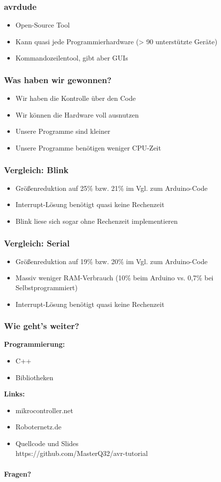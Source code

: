 \documentclass{beamer}
\begin{document}
\begin{frame}
\frametitle{avrdude}
\begin{itemize}
\item Open-Source Tool
\item Kann quasi jede Programmierhardware (> 90 unterstützte Geräte)
\item Kommandozeilentool, gibt aber GUIs
\end{itemize}

\end{frame}

\begin{frame}
\frametitle{Was haben wir gewonnen?}
\begin{itemize}
\item Wir haben die Kontrolle über den Code
\item Wir können die Hardware voll ausnutzen
\item Unsere Programme sind kleiner
\item Unsere Programme benötigen weniger CPU-Zeit
\end{itemize}
\end{frame}

\begin{frame}
\frametitle{Vergleich: Blink}

\begin{itemize}
\item Größenreduktion auf 25\% bzw. 21\% im Vgl. zum Arduino-Code
\item Interrupt-Lösung benötigt quasi keine Rechenzeit
\item Blink liese sich sogar ohne Rechenzeit implementieren
\end{itemize}
\end{frame}

\begin{frame}
\frametitle{Vergleich: Serial}

\begin{itemize}
\item Größenreduktion auf 19\% bzw. 20\% im Vgl. zum Arduino-Code
\item Massiv weniger RAM-Verbrauch (10\% beim Arduino vs. 0,7\% bei Selbstprogrammiert)
\item Interrupt-Lösung benötigt quasi keine Rechenzeit
\end{itemize}
\end{frame}

\begin{frame}
\frametitle{Wie geht's weiter?}

\textbf{Programmierung:}
\begin{itemize}
\item C++
\item Bibliotheken
\end{itemize}

\textbf{Links:}
\begin{itemize}
\item mikrocontroller.net
\item Roboternetz.de
\item Quellcode und Slides\\https://github.com/MasterQ32/avr-tutorial
\end{itemize}
\end{frame}

\begin{frame}
\frametitle{}
\begin{center}
\Huge{\textbf{Fragen?}}
\end{center}
\end{frame}
\end{document}

